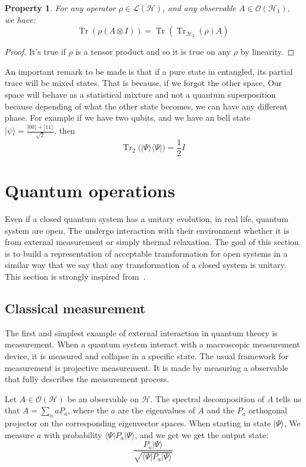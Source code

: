 \documentclass[10pt,a4paper]{report}
\theoremstyle{plain}
\newtheorem{prop}[thm]{Property}
\theoremstyle{definition}
\theoremstyle{remark}
\newcommand{\ket}[1]{|#1\rangle}
\newcommand{\bra}[1]{\langle#1|}
\DeclareMathOperator{\Tr}{Tr}
\begin{document}
\begin{prop}
  For any operator $\rho \in \mathcal{L}(\mathcal{H})$, and any observable
  $A\in\mathcal{O}(\mathcal{H}_1)$, we have:
  \[\Tr(\rho(A \otimes I)) = \Tr(\Tr_{\mathcal{H}_2}(\rho)A)\]
\end{prop}

\begin{proof}
  It's true if $\rho$ is a tensor product and so it is true on any $\rho$ by linearity.
\end{proof}

An important remark to be made is that if a pure state in entangled, its partial
trace will be mixed states. That is because, if we forgot the other space, Our
space will behave as a statistical mixture and not a quantum superposition
because depending of what the other state becomes, we can have any different phase.
For example if we have two qubits, and we have an
bell state $\ket \psi = \frac{\ket{00} + \ket{11}}{\sqrt 2}$, then
\[\Tr_2\big(\ket \Psi \bra \Psi\big) = \frac 12I\]


\section{Quantum operations}

Even if a closed quantum system has a unitary evolution, in real life, quantum
system are open, The undergo interaction with their environment whether it is
from external measurement or simply thermal relaxation. The goal of this section
is to build a representation of acceptable transformation for open systems in a
similar way that we say that any transformation of a closed system is unitary.
This section is strongly inspired from~\cite{QCQI}.

\subsection{Classical measurement}

The first and simplest example of external interaction in quantum theory is
measurement. When a quantum system interact with a macroscopic measurement
device, it is measured and collapse in a specific state. The usual framework for
measurement is projective measurement. It is
made by measuring a observable that fully describes the measurement
process.

Let $A \in \mathcal{O}(\mathcal{H})$ be an observable on $\mathcal{H}$. The
spectral decomposition of $A$ tells us that $A = \sum_a a P_a$, where the $a$
are the eigenvalues of $A$ and the $P_a$ orthogonal projector on the
corresponding eigenvector spaces. When starting in state $\ket \Psi$, We
measure $a$ with probability $\bra \Psi P_a \ket \Psi$, and we get we get
the output state:
\[ \frac{P_a \ket \Psi}{\sqrt{\bra \Psi P_a \ket \Psi}}\]
\end{document}
